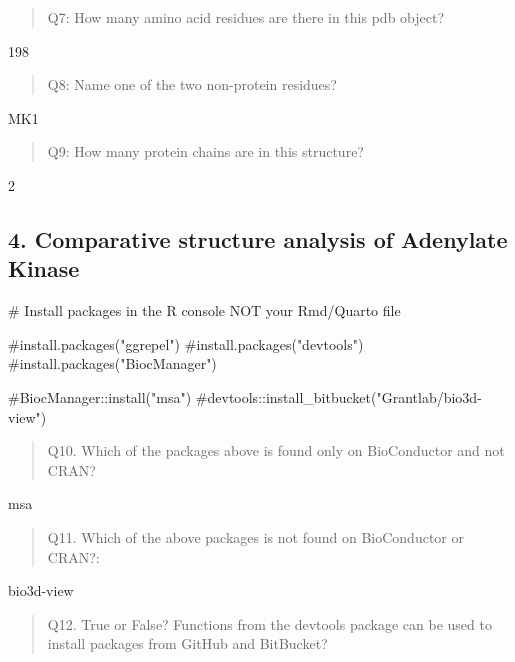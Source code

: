\documentclass[
  letterpaper,
  DIV=11,
  numbers=noendperiod]{scrartcl}
\newenvironment{Shaded}{\begin{snugshade}}{\end{snugshade}}
\newcommand{\CommentTok}[1]{\textcolor[rgb]{0.37,0.37,0.37}{#1}}
\begin{document}
\begin{quote}
Q7: How many amino acid residues are there in this pdb object?
\end{quote}

198

\begin{quote}
Q8: Name one of the two non-protein residues?
\end{quote}

MK1

\begin{quote}
Q9: How many protein chains are in this structure?
\end{quote}

2

\hypertarget{comparative-structure-analysis-of-adenylate-kinase}{%
\subsection{4. Comparative structure analysis of Adenylate
Kinase}\label{comparative-structure-analysis-of-adenylate-kinase}}

\begin{Shaded}
\begin{Highlighting}[]
\CommentTok{\# Install packages in the R console NOT your Rmd/Quarto file}

\CommentTok{\#install.packages("ggrepel")}
\CommentTok{\#install.packages("devtools")}
\CommentTok{\#install.packages("BiocManager")}

\CommentTok{\#BiocManager::install("msa")}
\CommentTok{\#devtools::install\_bitbucket("Grantlab/bio3d{-}view")}
\end{Highlighting}
\end{Shaded}

\begin{quote}
Q10. Which of the packages above is found only on BioConductor and not
CRAN?
\end{quote}

msa

\begin{quote}
Q11. Which of the above packages is not found on BioConductor or CRAN?:
\end{quote}

bio3d-view

\begin{quote}
Q12. True or False? Functions from the devtools package can be used to
install packages from GitHub and BitBucket?
\end{quote}
\end{document}
